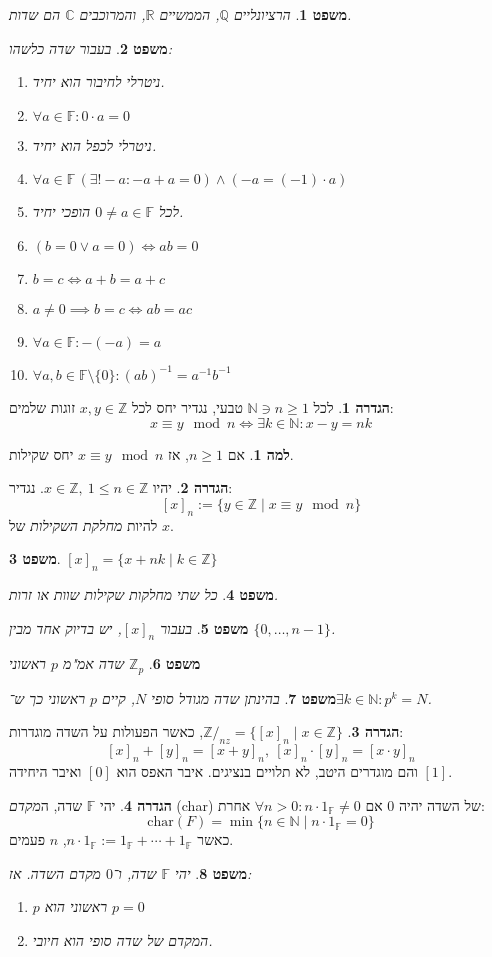 \documentclass[]{article}
\newcommand\N     {\mathbb{N}}
\newcommand\Z     {\mathbb{Z}}
\newcommand\R     {\mathbb{R}}
\newcommand\Q     {\mathbb{Q}}
\newcommand\C     {\mathbb{C}}
\newcommand\F         {\mathbb{F}}
\newcommand\co        {\colon}
\newcommand\op    {^{-1}}
\newtheorem{Theorem}{משפט}
\theoremstyle{definition}
\newtheorem{definition}{הגדרה}
\newtheorem{Lemma}{למה}
\newcommand\theo  [1] {\begin{Theorem}#1\end{Theorem}}
\newcommand\defi  [1] {\begin{definition}#1\end{definition}}
\newcommand\lem   [1] {\begin{Lemma}#1\end{Lemma}}
\begin{document}
\begin{multicols}{2}
		\theo{הרציונליים $\Q$, הממשיים $\R$, והמרוכבים $\C$ הם שדות. }
		\theo{בעבור שדה כלשהו: 
			\begin{enumerate}
				\item ניטרלי לחיבור הוא יחיד. 
				\item \hfil $\forall a \in \F \co 0 \cdot a = 0$
				\item ניטרלי לכפל הוא יחיד. 
				\item \hfil $\forall a \in \F \, (\exists! -a \co -a + a = 0) \land (-a = (-1) \cdot a)$
				\item לכל $0 \neq a \in \F$ הופכי יחיד. 
				\item \hfil $(b = 0 \lor a = 0) \iff ab = 0$
				\item \hfil $b = c \iff a + b = a + c$
				\item \hfil $a \neq 0 \implies b = c \iff ab = ac$
				\item \hfil $\forall a \in \F \co -(-a) = a$
				\item \hfil $\forall a, b \in \F \setminus \{0\} \co (ab)\op = a\op b\op$
			\end{enumerate}
		}
		\defi{לכל $\N \ni n \ge 1$ טבעי, נגדיר יחס לכל $x, y \in \Z$ זוגות שלמים: 
			\[ x \equiv y \mod n \iff \exists k \in \N \co x - y = nk \]
		}
		\lem{אם $n \ge 1$, אז $x \equiv y \mod n$ יחס שקילות. }
		\defi{יהיו $x \in \Z, \ 1 \le n \in \Z$. נגדיר:
			\[[x]_n := \{y \in \Z \mid x \equiv y \mod n\}\]
			  להיות \textit{מחלקת השקילות} של $x$.}
		\theo{$[x]_n = \{x + nk \mid k \in \Z\}$}
		\theo{כל שתי מחלקות שקילות שוות או זרות. }
		\theo{בעבור $[x]_n$, יש בדיוק אחד מבין $\{0, \dots, n - 1\}$. }
		\theo{$\Z_p$ שדה אמ"מ $p$ ראשוני}
		\theo{בהינתן שדה מגודל סופי $N$, קיים $p$ ראשוני כך ש־$\exists k \in \N\co p^k = N$.}
		\defi{$\Z/_{nz} = \{[x]_n \mid x \in \Z\}$, כאשר הפעולות על השדה מוגדרות: 
		\[ [x]_n + [y]_n = [x + y]_n, \ [x]_n \cdot [y]_n = [x \cdot y]_n \]
		והם מוגדרים היטב, לא תלויים בנציגים. איבר האפס הוא $[0]$ ואיבר היחידה $[1]$.}
		\defi{יהי $\F$ שדה, 
			ה\textit{מקדם} (char) של השדה יהיה $0$ אם $\forall n > 0 \co n \cdot 1_\F \neq 0$ אחרת: 
			\[ \mathrm{char}(F) = \min\{n \in \N\mid n \cdot 1_\F = 0\} \]
			כאשר $n \cdot 1_\F := 1_\F + \cdots + 1_\F$, $n$ פעמים. 
			}
		\theo{יהי $\F$ שדה, ו־$0 $ מקדם השדה. אז: 
		\begin{enumerate}
			\item $p$ ראשוני הוא $p = 0$
			\item המקדם של שדה סופי הוא חיובי. 
		\end{enumerate}
		}

\end{multicols}
\end{document}
